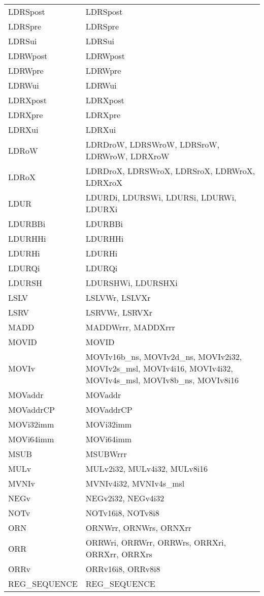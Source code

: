 \begin{xltabular}{\textwidth}{lX}
    LDRSpost & LDRSpost \\
    LDRSpre & LDRSpre \\
    LDRSui & LDRSui \\
    LDRWpost & LDRWpost \\
    LDRWpre & LDRWpre \\
    LDRWui & LDRWui \\
    LDRXpost & LDRXpost \\
    LDRXpre & LDRXpre \\
    LDRXui & LDRXui \\
    LDRoW & LDRDroW, LDRSWroW, LDRSroW, LDRWroW, LDRXroW \\
    LDRoX & LDRDroX, LDRSWroX, LDRSroX, LDRWroX, LDRXroX \\
    LDUR & LDURDi, LDURSWi, LDURSi, LDURWi, LDURXi \\
    LDURBBi & LDURBBi \\
    LDURHHi & LDURHHi \\
    LDURHi & LDURHi \\
    LDURQi & LDURQi \\
    LDURSH & LDURSHWi, LDURSHXi \\
    LSLV & LSLVWr, LSLVXr \\
    LSRV & LSRVWr, LSRVXr \\
    MADD & MADDWrrr, MADDXrrr \\
    MOVID & MOVID \\
    MOVIv & MOVIv16b\_ns, MOVIv2d\_ns, MOVIv2i32, MOVIv2s\_msl, MOVIv4i16, MOVIv4i32, MOVIv4s\_msl, MOVIv8b\_ns, MOVIv8i16 \\
    MOVaddr & MOVaddr \\
    MOVaddrCP & MOVaddrCP \\
    MOVi32imm & MOVi32imm \\
    MOVi64imm & MOVi64imm \\
    MSUB & MSUBWrrr \\
    MULv & MULv2i32, MULv4i32, MULv8i16 \\
    MVNIv & MVNIv4i32, MVNIv4s\_msl \\
    NEGv & NEGv2i32, NEGv4i32 \\
    NOTv & NOTv16i8, NOTv8i8 \\
    ORN & ORNWrr, ORNWrs, ORNXrr \\
    ORR & ORRWri, ORRWrr, ORRWrs, ORRXri, ORRXrr, ORRXrs \\
    ORRv & ORRv16i8, ORRv8i8 \\
    REG\_SEQUENCE & REG\_SEQUENCE \\

\end{xltabular}
